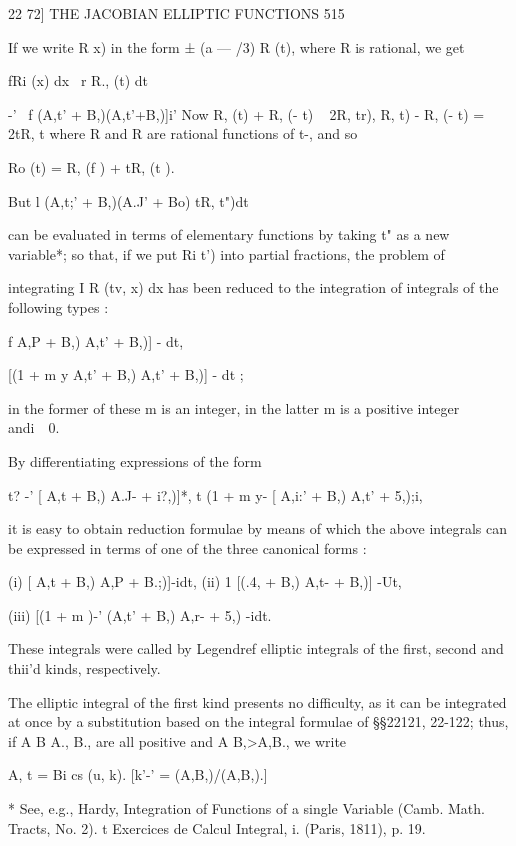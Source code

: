 22 72] THE JACOBIAN ELLIPTIC FUNCTIONS 515 

If we write R   x) in the form ± (a — /3) R  (t), where R  is rational, we get 

fRi (x) dx \  r R., (t) dt 

-'   ~f  (A,t' + B,)(A,t'+B,)]i' 
Now R, (t) + R, (- t) ~ 2R,  tr), R,  t) - R, (- t) = 2tR,  t%
where R  and R  are rational functions of t-, and so 

Ro (t) = R, (f ) + tR, (t ). 

But l (A,t;' + B,)(A.J' + Bo)  tR, t")dt 

can be evaluated in terms of elementary functions by taking t" as a new 
variable*; so that, if we put Ri t') into partial fractions, the problem of 



integrating I R (tv, x) dx has been reduced to the integration of integrals of 
the following types : 

 f    A,P + B,)  A,t' + B,)] -  dt, 

[(1 + m y   A,t' + B,)  A,t' + B,)] -  dt ; 

in the former of these m is an integer, in the latter m is a positive integer 
andi\ \   0. 

By differentiating expressions of the form 

t? -' [ A,t  + B,)  A.J-  + i?,)]*, t (1 + m y-  [ A,i:' + B,)  A,t' + 5,);i, 

it is easy to obtain reduction formulae by means of which the above 
integrals can be expressed in terms of one of the three canonical forms : 

(i)  [ A,t  + B,) A,P + B.;)]-idt, 
(ii) 1  [(.4,  + B,)  A,t- + B,)] -Ut, 

(iii) [(1 + m )-'  (A,t' + B,)  A,r- + 5,)  -idt. 

These integrals were called by Legendref elliptic integrals of the first, 
second and thii'd kinds, respectively. 

The elliptic integral of the first kind presents no difficulty, as it can be 
integrated at once by a substitution based on the integral formulae of 
§§22121, 22-122; thus, if A  B  A., B., are all positive and A B,>A,B., 
we write 

A, t = Bi cs (u, k). [k'-' = (A,B,)/(A,B,).] 

* See, e.g., Hardy, Integration of Functions of a single Variable (Camb. Math. Tracts, No. 2). 
t Exercices de Calcul Integral, i. (Paris, 1811), p. 19. 


